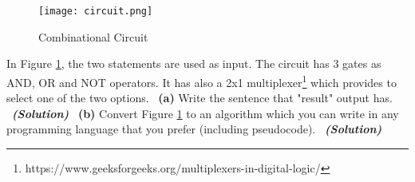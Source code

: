 \documentclass[a4 paper]{article}
\numberwithin{equation}{section}
\newcommand{\subproblem}[1]{~\newline\textbf{(#1)}}
\newcommand{\solution}{~\newline\textbf{\textit{(Solution)}} }
\newcommand{\0}{\mathbf{0}}
\begin{document}
\begin{figure}[htp]
	\centering
	\texttt{[image: circuit.png]}
	\caption{Combinational Circuit}
	\label{fig: circuit}
	
\end{figure}

In Figure \ref{fig: circuit}, the two statements are used as input. The circuit has 3 gates as AND, OR and NOT operators. It has also a 2x1 multiplexer\footnote{https://www.geeksforgeeks.org/multiplexers-in-digital-logic/} which provides to select one of the two options. 
\subproblem{a} Write the sentence that "result" output has.
\solution
\newline
\subproblem{b} Convert Figure \ref{fig: circuit} to an algorithm which you can write in any programming language that you prefer (including pseudocode).
\solution
\end{document}
